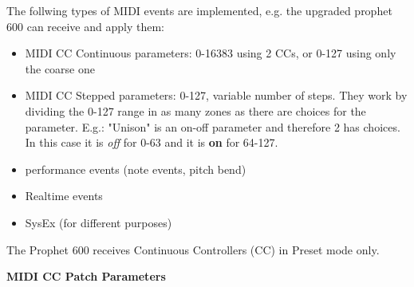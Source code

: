 The follwing types of MIDI events are implemented, e.g. the upgraded prophet 600 can receive and apply them:

\begin{itemize}
  \setlength\itemsep{0cm}
  \item MIDI CC Continuous parameters: 0-16383 using 2 CCs, or 0-127 using only the coarse one
  \item MIDI CC Stepped parameters: 0-127, variable number of steps. They work by dividing the 0-127 range in as many zones as there are choices for the parameter. E.g.: "Unison" is an on-off parameter and therefore 2 has choices. In this case it is \textit{off} for 0-63 and it is \textbf{on} for 64-127.
  \item performance events (note events, pitch bend)
  \item Realtime events
  \item SysEx (for different purposes)
\end{itemize}

The Prophet 600 receives Continuous Controllers (CC) in Preset mode only. 

\textbf{MIDI CC Patch Parameters} 

\footnotesize
\renewcommand{\arraystretch}{1.3}

